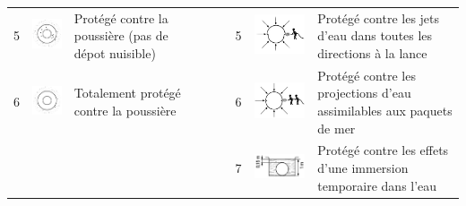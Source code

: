 \begin{landscape}
\begin{xltabular}{\linewidth}{p{0.3cm} m{2cm} X p{0.3cm} m{2cm} X p{0.3cm} m{2.2cm} X}
5 		& 	\includegraphics[scale=1.1]{5X.png} & Protégé contre la poussière (pas de dépot nuisible)  	& 	& & & 5 & 	\includegraphics[scale=1.1]{X5.png}	&	Protégé contre les jets d'eau dans toutes les directions à la lance \\
6 		& 	\includegraphics[scale=1.1]{6X.png} & Totalement protégé contre la poussière 	& 	& & & 6 & 	\includegraphics[scale=1.1]{X6.png}	&	Protégé contre les projections d'eau assimilables aux paquets de mer \\
 		&  & 	& 	& & & 7 & 	\includegraphics[scale=1.1]{X7.png}	&	Protégé contre les effets d'une immersion temporaire dans l'eau \\

\end{xltabular}
\end{landscape}
